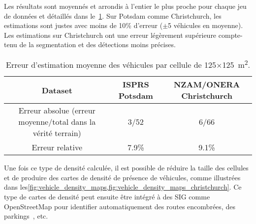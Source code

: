 Les résultats sont moyennés et arrondis à l'entier le plus proche pour chaque jeu de données et détaillés dans le~\cref{table:results_counting}. Sur Potsdam comme Christchurch, les estimations sont justes avec moins de 10\% d'erreur ($\pm$5 véhicules en moyenne). Les estimations sur Christchurch ont une erreur légèrement supérieure compte-tenu de la segmentation et des détections moins précises.

\begin{table}[t]
\centering
  \caption{Erreur d'estimation moyenne des véhicules par cellule de 125$\times$\SI{125}{\meter\squared}.}
  \label{table:results_counting}
  \begin{tabular}{ccc}
  \toprule
  \textbf{Dataset} & \textbf{ISPRS Potsdam} & \textbf{NZAM/ONERA Christchurch}\\
  \midrule
  Erreur absolue (erreur moyenne/total dans la vérité terrain) & 3/52 & 6/66\\
  Erreur relative & 7.9\% & 9.1\%\\
  \bottomrule
  \end{tabular}
\end{table}

Une fois ce type de densité calculée, il est possible de réduire la taille des cellules et de produire des cartes de densité de présence de véhicules, comme illustrées dans les\cref{fig:vehicle_density_maps,fig:vehicle_density_maps_christchurch}. Ce type de cartes de densité peut ensuite être intégré à des \gls{SIG} comme OpenStreetMap pour identifier automatiquement des routes encombrées, des parkings~\cite{kamenetsky_aerial_2015}, etc.

